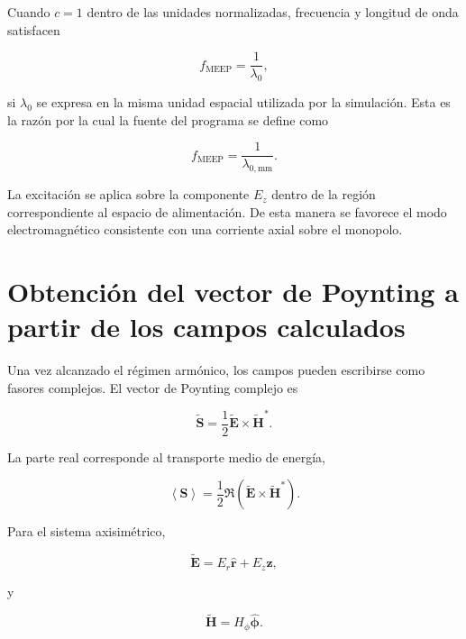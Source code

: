 Cuando $c=1$ dentro de las unidades normalizadas, frecuencia y longitud de onda satisfacen

\begin{equation}
f_{\mathrm{MEEP}}
=
\frac{1}{\lambda_0},
\end{equation}

si $\lambda_0$ se expresa en la misma unidad espacial utilizada por la simulación. Esta es la razón por la cual la fuente del programa se define como

\begin{equation}
f_{\mathrm{MEEP}}
=
\frac{1}{\lambda_{0,\mathrm{mm}}}.
\end{equation}

La excitación se aplica sobre la componente $E_z$ dentro de la región correspondiente al espacio de alimentación. De esta manera se favorece el modo electromagnético consistente con una corriente axial sobre el monopolo.

\section{Obtención del vector de Poynting a partir de los campos calculados}

Una vez alcanzado el régimen armónico, los campos pueden escribirse como fasores complejos. El vector de Poynting complejo es

\begin{equation}
\widetilde{\mathbf{S}}
=
\frac{1}{2}
\widetilde{\mathbf{E}}
\times
\widetilde{\mathbf{H}}^{*}.
\end{equation}

La parte real corresponde al transporte medio de energía,

\begin{equation}
\left\langle
\mathbf{S}
\right\rangle
=
\frac{1}{2}
\Re
\left(
\widetilde{\mathbf{E}}
\times
\widetilde{\mathbf{H}}^{*}
\right).
\label{eq:poynting_promedio}
\end{equation}

Para el sistema axisimétrico,

\begin{equation}
\widetilde{\mathbf{E}}
=
E_r\hat{\mathbf{r}}
+
E_z\hat{\mathbf{z}},
\end{equation}

y

\begin{equation}
\widetilde{\mathbf{H}}
=
H_\phi\hat{\boldsymbol{\phi}}.
\end{equation}

